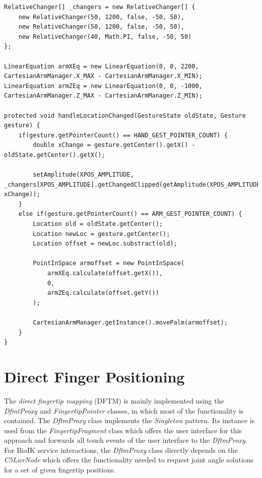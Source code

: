 \begin{lstlisting}[caption={Example usage of RelativeChanger in RelativeSynergyProxy},label=lst:impl:syn:expl]
RelativeChanger[] _changers = new RelativeChanger[] {
	new RelativeChanger(50, 1200, false, -50, 50),
	new RelativeChanger(50, 1200, false, -50, 50),
	new RelativeChanger(40, Math.PI, false, -50, 50)
};

LinearEquation armXEq = new LinearEquation(0, 0, 2200, CartesianArmManager.X_MAX - CartesianArmManager.X_MIN);
LinearEquation armZEq = new LinearEquation(0, 0, -1000, CartesianArmManager.Z_MAX - CartesianArmManager.Z_MIN);

protected void handleLocationChanged(GestureState oldState, Gesture gesture) {
	if(gesture.getPointerCount() == HAND_GEST_POINTER_COUNT) {
		double xChange = gesture.getCenter().getX() - oldState.getCenter().getX();
		
		setAmplitude(XPOS_AMPLITUDE, _changers[XPOS_AMPLITUDE].getChangedClipped(getAmplitude(XPOS_AMPLITUDE), xChange));
	}
	else if(gesture.getPointerCount() == ARM_GEST_POINTER_COUNT) {
		Location old = oldState.getCenter();
		Location newLoc = gesture.getCenter();
		Location offset = newLoc.substract(old);
		
		PointInSpace armoffset = new PointInSpace(
			armXEq.calculate(offset.getX()),
			0,
			armZEq.calculate(offset.getY())
		);
		
		CartesianArmManager.getInstance().movePalm(armoffset);
	}
}
\end{lstlisting}


\section{Direct Finger Positioning}
\label{sec:impl:dfmt}

The \textit{direct fingertip mapping} (DFTM) is mainly implemented using the \textit{DfmtProxy} and \textit{FingertipPointer} classes, in which most of the functionality is contained. The \textit{DftmProxy} class implements the \textit{Singleton} pattern. Its instance is used from the \textit{FingertipFragment} class which offers the user interface for this approach and forwards all touch events of the user interface to the \textit{DftmProxy}. For BioIK service interactions, the \textit{DftmProxy} class directly depends on the \textit{C5LwrNode} which offers the functionality needed to request joint angle solutions for a set of given fingertip positions.

